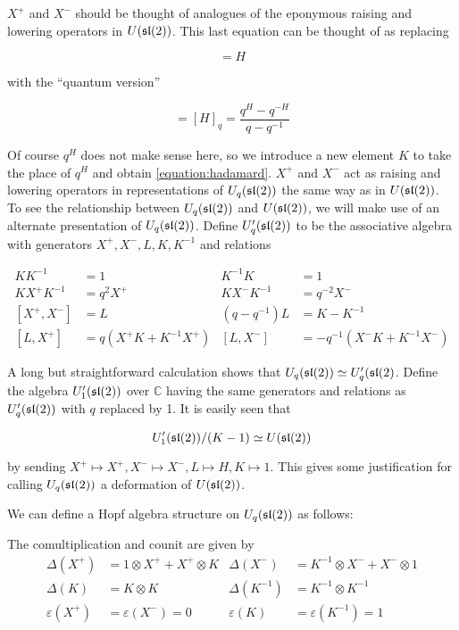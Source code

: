 $X^+$ and $X^-$ should be thought of analogues  of the eponymous raising and lowering operators
in $U(\mathfrak{sl}(2))$. This last equation can be thought of as replacing 

\begin{equation}
[X^+,X^-] = H
\end{equation}

with the ``quantum version''

\begin{equation}
[X^+,X^-] = [H]_q = \frac{q^H - q^{-H}}{q - q^{-1}}
\end{equation}

Of course $q^H$ does not make sense here, so we introduce a new element $K$ to
take the place of $q^H$ and obtain \ref{equation:hadamard}. $X^+$ and $X^-$ act
as raising and lowering operators in representations of $U_q(\mathfrak{sl}(2))$ the same
way as in $U(\mathfrak{sl}(2))$. To see the relationship between $U_q(\mathfrak{sl}(2))$
and $U(\mathfrak{sl}(2))$, we will make use of an alternate presentation of
$U_q(\mathfrak{sl}(2))$.  Define $U'_q(\mathfrak{sl}(2))$ to be the associative algebra with
generators $ X^+ ,X^-,L,K,K^{-1}$ and relations

\begin{align}
    KK^{-1} &= 1 &  K^{-1}K  &=1 \\
    KX^+K^{-1} &= q^2 X^+ & KX^-K^{-1} &= q^{-2} X^- \\
    [X^+,X^-] &= L  & (q - q^{-1})L &= K-K^{-1} \\
    [L,X^+] &= q(X^+K + K^{-1}X^+) & [L,X^-] &= -q^{-1}(X^-K + K^{-1}X^-)
\end{align}

A long but straightforward calculation shows that $U_q(\mathfrak{sl}(2)) \simeq U_q'(\mathfrak{sl}(2)$. 
Define the algebra $U_1'(\mathfrak{sl}(2))$ over $\mathbb{C}$ having the same
generators and relations as $U_q'(\mathfrak{sl}(2))$ with $q$ replaced by 1. It is
easily seen that 

\begin{equation}
U_1'(\mathfrak{sl}(2)) /(K-1) \simeq U(\mathfrak{sl}(2))
\end{equation}

by sending $X^+ \mapsto X^+, X^- \mapsto X^-, L \mapsto H, K \mapsto 1$. This gives
some justification for calling $U_q(\mathfrak{sl}(2))$ a deformation of $U(\mathfrak{sl}(2))$.

We can define a Hopf algebra structure on $U_q(\mathfrak{sl}(2))$ as follows:

The comultiplication and counit are given by
\begin{align}
    \Delta(X^+) &= 1 \otimes  X^+  +  X^+  \otimes K &  \Delta(X^-) &= K^{-1} \otimes X^- + X^- \otimes 1 \\
    \Delta(K) &= K \otimes K &  \Delta(K^{-1}) &= K^{-1} \otimes K^{-1}\\ 
    \varepsilon(X^+) &= \varepsilon(X^-) = 0 &  \varepsilon(K) &= \varepsilon(K^{-1}) = 1
\end{align}

